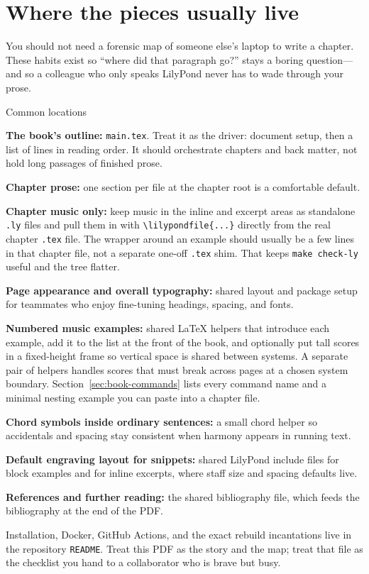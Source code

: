 \section{Where the pieces usually live}

You should not need a forensic map of someone else's laptop to write a chapter. These habits exist so ``where did that paragraph go?'' stays a boring question---and so a colleague who only speaks LilyPond never has to wade through your prose.

\begin{bookStyledList}{Common locations}
\item \textbf{The book's outline:} \verb|main.tex|. Treat it as the driver: document setup, then a list of \verb|| lines in reading order. It should orchestrate chapters and back matter, not hold long passages of finished prose.
\item \textbf{Chapter prose:} one section per file at the chapter root is a comfortable default.
\item \textbf{Chapter music only:} keep music in the inline and excerpt areas as standalone \texttt{.ly} files and pull them in with \verb|\lilypondfile{...}| directly from the real chapter \texttt{.tex} file. The wrapper around an example should usually be a few lines in that chapter file, not a separate one-off \texttt{.tex} shim. That keeps \texttt{make check-ly} useful and the tree flatter.
\item \textbf{Page appearance and overall typography:} shared layout and package setup for teammates who enjoy fine-tuning headings, spacing, and fonts.
\item \textbf{Numbered music examples:} shared LaTeX helpers that introduce each example, add it to the list at the front of the book, and optionally put tall scores in a fixed-height frame so vertical space is shared between systems. A separate pair of helpers handles scores that must break across pages at a chosen system boundary. Section~\ref{sec:book-commands} lists every command name and a minimal nesting example you can paste into a chapter file.
\item \textbf{Chord symbols inside ordinary sentences:} a small chord helper so accidentals and spacing stay consistent when harmony appears in running text.
\item \textbf{Default engraving layout for snippets:} shared LilyPond include files for block examples and for inline excerpts, where staff size and spacing defaults live.
\item \textbf{References and further reading:} the shared bibliography file, which feeds the bibliography at the end of the PDF.
\end{bookStyledList}

Installation, Docker, GitHub Actions, and the exact rebuild incantations live in the repository \texttt{README}. Treat this PDF as the story and the map; treat that file as the checklist you hand to a collaborator who is brave but busy.

